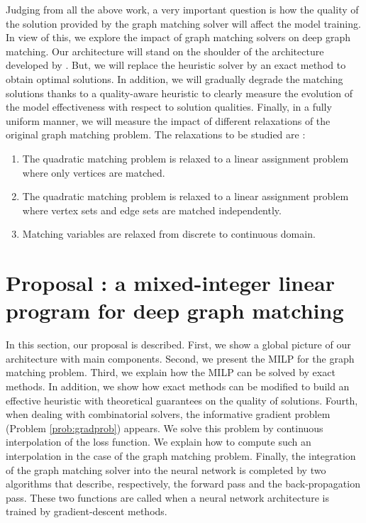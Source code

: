 \documentclass[times,onecolumn,final,authoryear]{article}
\theoremstyle{definition}
\begin{document}
Judging from all the above work, a very important question is how the quality of the solution provided by the graph matching solver will affect the model training. In view of this, we explore the impact of graph matching solvers on deep graph matching. Our architecture will stand on the shoulder of the architecture developed by \cite{BB-GM}. But, we will replace the heuristic solver \cite{DBLP:journals/corr/SwobodaRAKS16} by an exact method to obtain optimal solutions. In addition, we will gradually degrade the matching solutions thanks to a quality-aware heuristic to clearly measure the evolution of the model effectiveness with respect to solution qualities. Finally, in a fully uniform manner, we will measure the impact of different relaxations of the original graph matching problem. The relaxations to be studied are : 
\begin{enumerate}
    \item The quadratic matching problem is relaxed to a linear assignment problem where only vertices are matched.
    \item The quadratic matching problem is relaxed to a linear assignment problem where  vertex sets and edge sets are matched independently.
    \item Matching variables are relaxed from discrete to continuous domain.
\end{enumerate}


\section{Proposal : a mixed-integer linear program for deep graph matching}
\label{sec:proposal}
In this section, our proposal is described. First, we show a global picture of our architecture with main components. Second, we present the MILP for the graph matching problem. Third, we explain how the MILP can be solved by exact methods. In addition, we show how exact methods can be modified to build an effective heuristic with theoretical guarantees on the quality of solutions. Fourth, when dealing with combinatorial solvers, the informative gradient problem  (Problem \ref{prob:gradprob}) appears. We solve this problem by continuous interpolation of the loss function. We explain how to compute such an interpolation in the case of the graph matching problem. Finally, the integration of the graph matching solver into the neural network is completed by two algorithms that describe, respectively, the forward pass and the back-propagation pass. These two functions are called when a neural network architecture is trained by gradient-descent methods.
\end{document}
